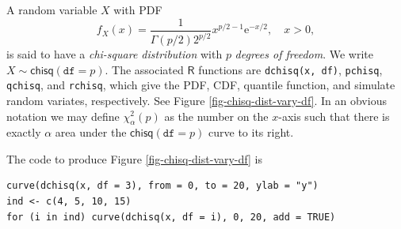 \documentclass[captions=tableheading]{scrbook}
\begin{document}
A random variable \(X\) with PDF
\begin{equation}
f_{X}(x)=\frac{1}{\Gamma(p/2)2^{p/2}}x^{p/2-1}\mathrm{e}^{-x/2},\quad x>0,
\end{equation}
is said to have a \emph{chi-square distribution} with \(p\) \emph{degrees of freedom}. We write \(X\sim\mathsf{chisq}(\mathtt{df}=p)\). The associated \(\mathsf{R}\) functions are \texttt{dchisq(x, df)}, \texttt{pchisq}, \texttt{qchisq}, and \texttt{rchisq}, which give the PDF, CDF, quantile function, and simulate random variates, respectively. See Figure \ref{fig-chisq-dist-vary-df}. In an obvious notation we may define \(\chi_{\alpha}^{2}(p)\) as the number on the \(x\)-axis such that there is exactly \(\alpha\) area under the \(\mathsf{chisq}(\mathtt{df}=p)\) curve to its right.

The code to produce Figure \ref{fig-chisq-dist-vary-df} is


\lstset{language=R}
\begin{lstlisting}
curve(dchisq(x, df = 3), from = 0, to = 20, ylab = "y")
ind <- c(4, 5, 10, 15)
for (i in ind) curve(dchisq(x, df = i), 0, 20, add = TRUE)
\end{lstlisting}
\end{document}

